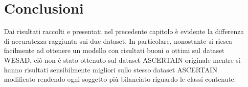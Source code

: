 \chapter{Conclusioni}
Dai risultati raccolti e presentati nel precedente capitolo è evidente la differenza di accuratezza raggiunta sui due dataset. In particolare, nonostante si riesca facilmente ad ottenere un modello con risultati buoni o ottimi sul dataset WESAD, ciò non è stato ottenuto sul dataset ASCERTAIN originale mentre si hanno risultati sensibilmente migliori sullo stesso dataset ASCERTAIN modificato rendendo ogni soggetto più bilanciato riguardo le classi contenute.


